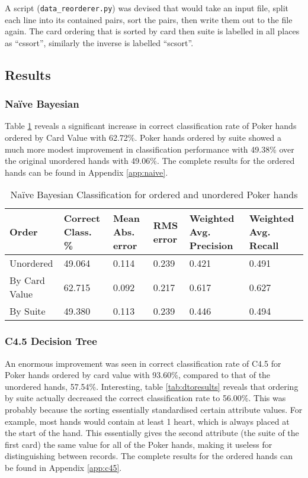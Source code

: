 \documentclass[10pt, a4paper]{article}
\begin{document}
A script (\texttt{data\_reorderer.py}) was devised that would take an input file, split each line into its contained pairs, sort the pairs, then write them out to the file again. The card ordering that is sorted by card then suite is labelled in all places as ``cssort'', similarly the inverse is labelled ``scsort''.

\subsection*{Results}

\subsubsection*{Na\"ive Bayesian}

Table \ref{tab:nboresults} reveals a significant increase in correct classification rate of Poker hands ordered by Card Value with 62.72\%. Poker hands ordered by suite showed a much more modest improvement in classification performance with 49.38\% over the original unordered hands with 49.06\%. The complete results for the ordered hands can be found in Appendix \ref{app:naive}.

\begin{table}[htbp]
  \centering  
    \begin{tabular}{p{3cm}p{1.5cm}p{1.5cm}p{1.5cm}p{1.5cm}p{1.5cm}}
    \toprule
    \textbf{Order} & Correct Class. \% & Mean Abs. error & RMS error & Weighted Avg. Precision & Weighted Avg. Recall \\
    \midrule
    Unordered & 49.064 & 0.114 & 0.239 & 0.421 & 0.491 \\
    By Card Value & 62.715 & 0.092 & 0.217 & 0.617 & 0.627 \\
    By Suite & 49.380 & 0.113 & 0.239 & 0.446 & 0.494 \\
    \bottomrule
    \end{tabular}%
  \caption{Na\"ive Bayesian Classification for ordered and unordered Poker hands}
  \label{tab:nboresults}%
\end{table}%

\subsubsection*{C4.5 Decision Tree}

An enormous improvement was seen in correct classification rate of C4.5 for Poker hands ordered by card value with 93.60\%, compared to that of the unordered hands, 57.54\%. Interesting, table \ref{tab:dtoresults} reveals that ordering by suite actually decreased the correct classification rate to 56.00\%. This was probably because the sorting essentially standardised certain attribute values. For example, most hands would contain at least 1 heart, which is always placed at the start of the hand. This essentially gives the second attribute (the suite of the first card) the same value for all of the Poker hands, making it useless for distinguishing between records. The complete results for the ordered hands can be found in Appendix \ref{app:c45}.
\end{document}
